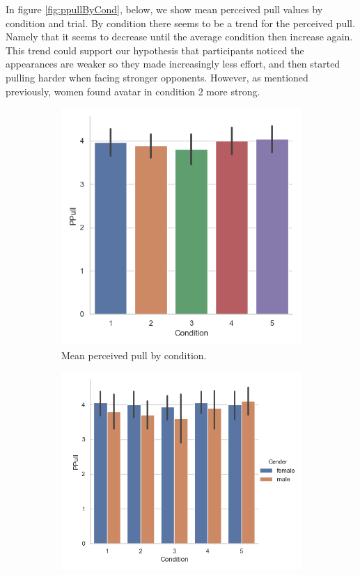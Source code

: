 In figure \ref{fig:ppullByCond}, below, we show mean perceived pull values by condition and trial. By condition there seems to be a trend for the perceived pull. Namely that it seems to decrease until the average condition then increase again. This trend could support our hypothesis that participants noticed the appearances are weaker so they made increasingly less effort, and then started pulling harder when facing stronger opponents. However, as mentioned previously, women found avatar in condition 2 more strong.

\begin{figure}[H]
 \begin{subfigure}[b]{0.5\textwidth}
     \centering
     \includegraphics[scale=0.5]{Files/Plots/ppull_by_condition_mean.png}
     \caption{Mean perceived pull by condition.}
     \label{fig:meanPPullCond}
 \end{subfigure}
  \begin{subfigure}[b]{0.5\textwidth}
     \centering
     \includegraphics[scale=0.5]{Files/Plots/ppull_by_condition_median_gen.png}

\end{subfigure}
\end{figure}
